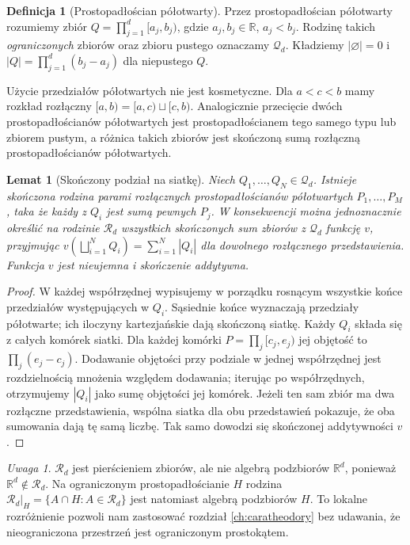\documentclass[11pt,a4paper,oneside]{book}
\numberwithin{equation}{chapter}
\theoremstyle{plain}
\newtheorem{lemat}[twierdzenie]{Lemat}
\theoremstyle{definition}
\newtheorem{definicja}[twierdzenie]{Definicja}
\theoremstyle{remark}
\newtheorem{uwaga}[twierdzenie]{Uwaga}
\begin{document}
\begin{definicja}[Prostopadłościan półotwarty]
\label{def:halfopen-box}
Przez prostopadłościan półotwarty rozumiemy zbiór
$Q=\prod_{j=1}^d[a_j,b_j)$, gdzie $a_j,b_j\in\mathbb R$,
$a_j<b_j$. Rodzinę takich \emph{ograniczonych} zbiorów
oraz zbioru pustego oznaczamy $\mathcal Q_d$.
Kładziemy $|\varnothing|=0$ i
$|Q|=\prod_{j=1}^d(b_j-a_j)$ dla niepustego $Q$.
\end{definicja}

Użycie przedziałów półotwartych nie jest kosmetyczne.
Dla $a<c<b$ mamy rozkład rozłączny
$[a,b)=[a,c)\sqcup[c,b)$. Analogicznie przecięcie
dwóch prostopadłościanów półotwartych jest
prostopadłościanem tego samego typu lub zbiorem pustym,
a różnica takich zbiorów jest skończoną sumą rozłączną
prostopadłościanów półotwartych.

\begin{lemat}[Skończony podział na siatkę]
\label{lem:rect-grid}
Niech $Q_1,\ldots,Q_N\in\mathcal Q_d$.
Istnieje skończona rodzina parami rozłącznych
prostopadłościanów półotwartych $P_1,\ldots,P_M$, taka że
każdy z $Q_i$ jest sumą pewnych $P_j$. W konsekwencji
można jednoznacznie określić na rodzinie $\mathcal R_d$
wszystkich skończonych sum zbiorów z $\mathcal Q_d$
funkcję $v$, przyjmując
$v(\bigsqcup_{i=1}^NQ_i)=\sum_{i=1}^N|Q_i|$
dla dowolnego rozłącznego przedstawienia.
Funkcja $v$ jest nieujemna i skończenie addytywna.
\end{lemat}

\begin{proof}
W każdej współrzędnej wypisujemy w porządku rosnącym
wszystkie końce przedziałów występujących w $Q_i$.
Sąsiednie końce wyznaczają przedziały półotwarte;
ich iloczyny kartezjańskie dają skończoną siatkę.
Każdy $Q_i$ składa się z całych komórek siatki.
Dla każdej komórki $P=\prod_j[c_j,e_j)$ jej objętość
to $\prod_j(e_j-c_j)$. Dodawanie objętości przy
podziale w jednej współrzędnej jest rozdzielnością
mnożenia względem dodawania; iterując po współrzędnych,
otrzymujemy $|Q_i|$ jako sumę objętości jej komórek.
Jeżeli ten sam zbiór ma dwa rozłączne przedstawienia,
wspólna siatka dla obu przedstawień pokazuje, że oba
sumowania dają tę samą liczbę. Tak samo dowodzi się
skończonej addytywności $v$.
\end{proof}

\begin{uwaga}
$\mathcal R_d$ jest pierścieniem zbiorów, ale nie
algebrą podzbiorów $\mathbb R^d$, ponieważ
$\mathbb R^d\notin\mathcal R_d$. Na ograniczonym
prostopadłościanie $H$ rodzina
$\mathcal R_d|_H=\{A\cap H:A\in\mathcal R_d\}$
jest natomiast algebrą podzbiorów $H$.
To lokalne rozróżnienie pozwoli nam zastosować
rozdział \ref{ch:caratheodory} bez udawania, że
nieograniczona przestrzeń jest ograniczonym prostokątem.
\end{uwaga}
\end{document}
